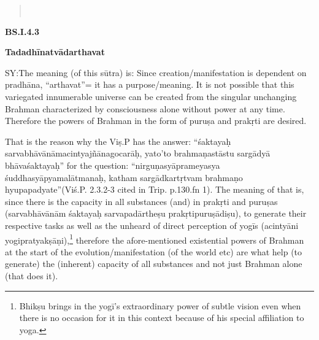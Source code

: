 \begin{verse}
\\
\end{verse}


\vskip 4pt

\textbf{BS.I.4.3}

\vskip 4pt

\textbf{Tadadhīnatvādarthavat}

\vskip 4pt

SY:The meaning (of this sūtra) is: Since creation/manifestation is dependent on pradhāna, “arthavat”= it has a purpose/meaning. It is not possible that this variegated innumerable universe can be created from the singular unchanging Brahman characterized by consciousness alone without power at any time. Therefore the powers of Brahman in the form of puruṣa and prakṛti are desired.

\vskip 4pt

That is the reason why the Viṣ.P has the answer: “śaktayaḥ sarvabhāvānāmacintyajñānagocarāḥ, yato’to brahmaṇastāstu sargādyā bhāvaśaktayaḥ” for the question: “nirguṇasyāprameyasya śuddhasyāpyamalātmanaḥ, katham sargādkartṛtvam brahmaṇo hyupapadyate”\break (Viś.P. 2.3.2-3 cited in Trip. p.130.fn 1). The meaning of that is, since there is the capacity in all substances (and) in prakṛti and puruṣas (sarvabhāvānām śaktayaḥ sarvapadārtheṣu prakṛtipuruṣādiṣu), to generate their respective tasks as well as the unheard of direct perception of yogīs (acintyāni yogipratyakṣāṇi),\footnote{Bhikṣu brings in the yogī’s extraordinary power of subtle vision even when there is no occasion for it in this context because of his special affiliation to yoga.} therefore the afore-mentioned existential powers of Brahman at the start of the evolution/manifesta\-tion (of the world etc) are what help (to generate) the (inherent) capacity of all substances and not just Brahman alone (that does it).

\vskip 4pt


